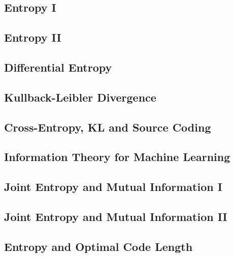 
\subsection{Entropy I}


\subsection{Entropy II}


\subsection{Differential Entropy}


\subsection{Kullback-Leibler Divergence}


\subsection{Cross-Entropy, KL and Source Coding}


\subsection{Information Theory for Machine Learning}


\subsection{Joint Entropy and Mutual Information I}


\subsection{Joint Entropy and Mutual Information II}


\subsection{Entropy and Optimal Code Length}




